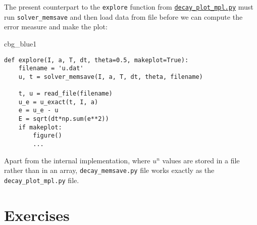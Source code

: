 \documentclass[graybox,sectrefs,envcountresetchap,open=right,final]{svmonodo}
\newenvironment{_cod_tight}[1]{
   \def\FrameCommand{\colorbox{#1}}
   \FrameRule0.6pt\MakeFramed {\FrameRestore}\vskip3mm}
   {\vskip0mm\endMakeFramed}
\newenvironment{cod}[1]{
\bgroup\rmfamily
\fboxsep=0mm\relax
\begin{_cod_tight}{#1}
\list{}{\parsep=-2mm\parskip=0mm\topsep=0pt\leftmargin=2mm
\rightmargin=2\leftmargin\leftmargin=4pt\relax}
\item\relax}
{\endlist\end{_cod_tight}\egroup}
\begin{document}
The present counterpart to the \texttt{explore} function from
\href{{http://tinyurl.com/ofkw6kc/alg/decay_plot_mpl.py}}{\nolinkurl{decay_plot_mpl.py}} must run
\Verb!solver_memsave! and then load data from file before we can compute
the error measure and make the plot:

\begin{cod}{cbg_blue1}\begin{Verbatim}[numbers=none,fontsize=\fontsize{9pt}{9pt},baselinestretch=0.95,xleftmargin=2mm]
def explore(I, a, T, dt, theta=0.5, makeplot=True):
    filename = 'u.dat'
    u, t = solver_memsave(I, a, T, dt, theta, filename)

    t, u = read_file(filename)
    u_e = u_exact(t, I, a)
    e = u_e - u
    E = sqrt(dt*np.sum(e**2))
    if makeplot:
        figure()
        ...
\end{Verbatim}
\end{cod}
\noindent

Apart from the internal implementation, where $u^n$ values are stored
in a file rather than in an array, \Verb!decay_memsave.py! file works
exactly as the \Verb!decay_plot_mpl.py! file.

\section{Exercises}
\end{document}
